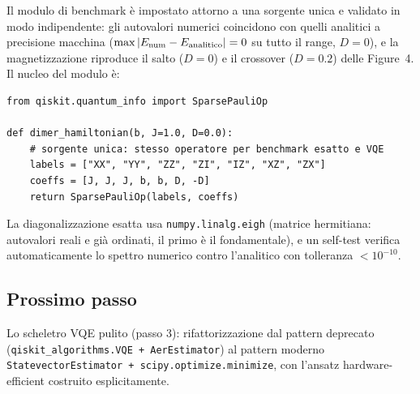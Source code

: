 \documentclass[11pt,a4paper]{article}
\begin{document}
Il modulo di benchmark \`e impostato attorno a una sorgente unica e validato in modo
indipendente: gli autovalori numerici coincidono con quelli analitici a precisione
macchina ($\max|E_{\rm num}-E_{\rm analitico}|=0$ su tutto il range, $D=0$), e la
magnetizzazione riproduce il salto ($D=0$) e il crossover ($D=0.2$) delle Figure~4.
Il nucleo del modulo \`e:

{\small
\begin{verbatim}
from qiskit.quantum_info import SparsePauliOp

def dimer_hamiltonian(b, J=1.0, D=0.0):
    # sorgente unica: stesso operatore per benchmark esatto e VQE
    labels = ["XX", "YY", "ZZ", "ZI", "IZ", "XZ", "ZX"]
    coeffs = [J, J, J, b, b, D, -D]
    return SparsePauliOp(labels, coeffs)
\end{verbatim}
}

La diagonalizzazione esatta usa \texttt{numpy.linalg.eigh} (matrice hermitiana:
autovalori reali e gi\`a ordinati, il primo \`e il fondamentale), e un self-test
verifica automaticamente lo spettro numerico contro l'analitico con tolleranza
$<10^{-10}$.

\subsection{Prossimo passo}

Lo scheletro VQE pulito (passo 3): rifattorizzazione dal pattern deprecato
(\texttt{qiskit\_algorithms.VQE + AerEstimator}) al pattern moderno
\texttt{StatevectorEstimator + scipy.optimize.minimize}, con l'ansatz
hardware-efficient costruito esplicitamente.
\end{document}
